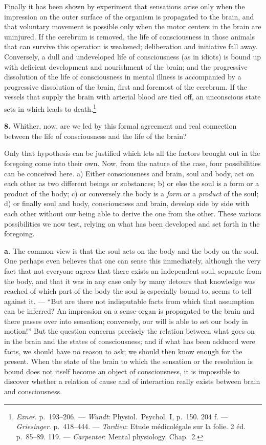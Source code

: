 \documentclass[12pt,a4paper]{book}
\newcommand{\opage}[1]{\marginnote{\footnotesize\textit{[#1]}}}
\begin{document}
Finally it has been shown by experiment that sensations arise only when
the impression on the outer surface of the organism is propagated to the
brain, and that voluntary movement is possible only when the motor
centers in the brain are uninjured. If the cerebrum is removed, the life
of consciousness in those animals that can survive this operation is
weakened; deliberation and initiative fall away. Conversely, a dull and
undeveloped life of consciousness (as in idiots) is bound up with
deficient development and nourishment of the brain; and the progressive
dissolution of the life of consciousness in mental illness is
accompanied by a progressive dissolution of the brain, first and
foremost of the cerebrum. If the vessels that supply the brain with
arterial blood are tied off, an unconscious state sets in which leads to
death.\footnote{\emph{Exner}. p.~193--206. --- \emph{Wundt}: Physiol.\
Psychol. I, p.~150. 204 f. --- \emph{Griesinger}. p.~418--444. ---
\emph{Tardieu}: Etude médicolégale sur la folie. 2 éd. p.~85--89. 119.
--- \emph{Carpenter}: Mental physiology. Chap.~2.}

\textbf{8.} Whither, now, are we led by this formal agreement and real
connection between the life of consciousness and the life of the brain?

Only that hypothesis can be justified which lets all the factors
brought out in the foregoing come into their own. Now, from the nature
of the case, four possibilities can be conceived here. a) Either
consciousness and brain, soul and body, act on each other as two
different beings or substances; b) or else the soul is a form or a
product of the body; c) or conversely the body is a \emph{form} or a
\emph{product} of the soul; d) or finally soul and body, consciousness
and brain, develop side by side with each other without our being able
to derive the one from the other. These various possibilities we now
test, relying on what has been developed and set forth in the
foregoing.

\textbf{a.} The common view is that the soul acts on the body and the
body on the soul. One perhaps even believes that one can sense this
immediately, although the very fact that not everyone agrees that there
exists an independent soul, separate from the body, and that it was in
any
\opage{67}case only by many detours that knowledge was reached of which
part of the body the soul is especially bound to, seems to tell against
it. --- ``But are there not indisputable facts from which that
assumption can be inferred? An impression on a sense-organ is propagated
to the brain and there passes over into sensation; conversely, our will
is able to set our body in motion!'' But the question concerns precisely
the relation between what goes on in the brain and the states of
consciousness; and if what has been adduced were facts, we should have
no reason to ask; we should then know enough for the present. When the
state of the brain to which the sensation or the resolution is bound
does not itself become an object of consciousness, it is impossible to
discover whether a relation of cause and of interaction really exists
between brain and consciousness.
\end{document}
